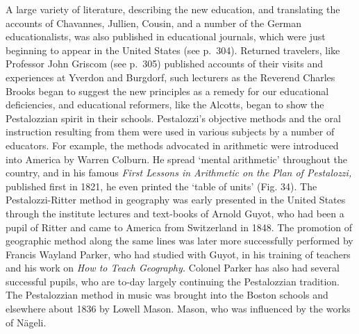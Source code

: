 \documentclass[
]{book}
\begin{document}
A large variety of literature, describing the new education, and translating the accounts of Chavannes, Jullien, Cousin, and a number of the German educationalists, was also published in educational journals, which were just beginning to appear in the United States (see p.~304). Returned travelers, like Professor John Griscom (see p.~305) published accounts of their visits and experiences at Yverdon and Burgdorf, such lecturers as the Reverend Charles Brooks began to suggest the new principles as a remedy for our educational deficiencies, and educational reformers, like the Alcotts, began to show the Pestalozzian spirit in their schools. Pestalozzi's objective methods and the oral instruction resulting from them were used in various subjects by a number of educators. For example, the methods advocated in arithmetic were introduced into America by Warren Colburn. He spread `mental arithmetic' throughout the country, and in his famous \emph{First Lessons in Arithmetic on the Plan of Pestalozzi,} published first in 1821, he even printed the `table of units' (Fig. 34). The Pestalozzi-Ritter method in geography was early presented in the United States through the institute lectures and text-books of Arnold Guyot, who had been a pupil of Ritter and came to America from Switzerland in 1848. The promotion of geographic method along the same lines was later more successfully performed by Francis Wayland Parker, who had studied with Guyot, in his training of teachers and his work on \emph{How to Teach Geography.} Colonel Parker has also had several successful pupils, who are to-day largely continuing the Pestalozzian tradition. The Pestalozzian method in music was brought into the Boston schools and elsewhere about 1836 by Lowell Mason. Mason, who was influenced by the works of Nägeli.
\end{document}
